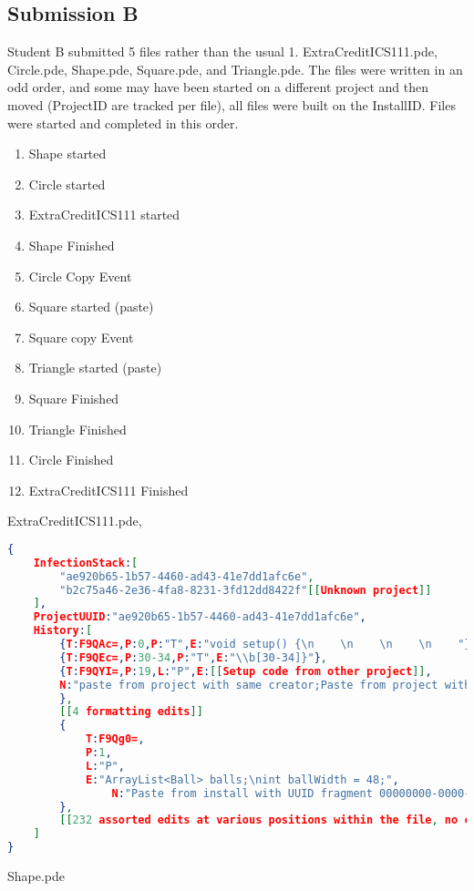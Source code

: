 \documentclass[12pt,final,thesis,actual]{uhthesis}
\newcommand{\n}{\hfill\break}
\newcommand{\installID}{InstallID\xspace}
\newcommand{\projectID}{ProjectID\xspace}
\begin{document}
\subsection{Submission B}
Student B submitted 5 files rather than the usual 1. ExtraCreditICS111.pde, Circle.pde, Shape.pde, Square.pde, and Triangle.pde.   The files were written in an odd order, and some may have been started on a different project and then moved (\projectID are tracked per file), all files were built on the \installID.  Files were started and completed in this order.
\begin{enumerate}[nosep]
\item Shape started
\item Circle started 
\item ExtraCreditICS111 started
\item Shape Finished
\item Circle Copy Event
\item Square started (paste)
\item Square copy Event
\item Triangle started (paste)
\item Square Finished
\item Triangle Finished
\item Circle Finished
\item ExtraCreditICS111 Finished

\end{enumerate}\n
\pagebreak
ExtraCreditICS111.pde,
\begin{lstlisting}[language=json]
{
	InfectionStack:[
		"ae920b65-1b57-4460-ad43-41e7dd1afc6e",
		"b2c75a46-2e36-4fa8-8231-3fd12dd8422f"[[Unknown project]]
	],
	ProjectUUID:"ae920b65-1b57-4460-ad43-41e7dd1afc6e",
	History:[
		{T:F9QAc=,P:0,P:"T",E:"void setup() {\n    \n    \n    \n    "},
		{T:F9QEc=,P:30-34,P:"T",E:"\\b[30-34]}"},
		{T:F9QYI=,P:19,L:"P",E:[[Setup code from other project]],
		N:"paste from project with same creator;Paste from project with UUID b2c75a46-2e36-4fa8-8231-3fd12dd8422f;"
		},
		[[4 formatting edits]]
		{
			T:F9Qg0=,
			P:1,
			L:"P",
			E:"ArrayList<Ball> balls;\nint ballWidth = 48;",
				N:"Paste from install with UUID fragment 00000000-0000-0000-0000-000000000000 -1 bytes long;"[[not enough room to encode UUID]]
		},
		[[232 assorted edits at various positions within the file, no copies or pastes]]
	]
}

\end{lstlisting}
\pagebreak
Shape.pde
\end{document}
